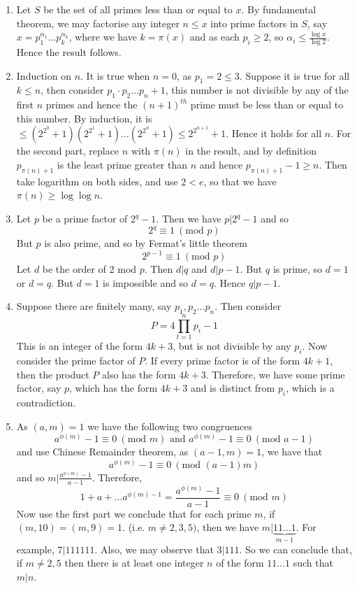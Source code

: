 \begin{enumerate}
\item Let $S$ be the set of all primes less than or equal to $x$. By fundamental theorem, we may factorise any integer $n \le x$ into prime factors in $S$, say $x=p_1^{\alpha_1} \ldots p_k^{\alpha_k}$, where we have $k=\pi(x)$ and as each $p_i \ge 2$, so $\alpha_i \le \frac{\log{x}}{\log{2}}$.
    Hence the result follows.
\item Induction on $n$. It is true when $n=0$, as $p_1=2 \le 3$. Suppose it is true for all $k \le n$, then consider $p_1 \cdot p_2 \ldots p_n +1$, this number is not divisible by any of the first $n$ primes and hence the $(n+1)^{th}$ prime must be less than or equal to this number. By induction, it is $\le (2^{2^0}+1)(2^{2^1}+1) \ldots (2^{2^n}+1) \le 2^{2^{n+1}}+1$. Hence it holds for all $n$. For the second part, replace $n$ with $\pi(n)$ in the result, and by definition $p_{\pi(n)+1}$ is the least prime greater than $n$ and hence $p_{\pi(n)+1}-1 \ge n$.
    Then take logarithm on both sides, and use $2 < e$, so that we have $\pi(n) \ge \log{\log{n}}$.
\item Let $p$ be a prime factor of $2^q-1$. Then we have $p|2^q -1$ and so
$$ 2^q \equiv 1~(\text{mod } p)$$ But $p$ is also prime, and so by Fermat's little theorem
$$ 2^{p-1} \equiv 1~(\text{mod } p)$$ Let $d$ be the order of $2$ mod $p$. Then $d|q$ and $d|p-1$. But $q$ is prime, so $d=1$ or $d=q$. But $d=1$ is impossible and so $d=q$. Hence $q|p-1$.
\item Suppose there are finitely many, say $p_1,p_2 \ldots p_n$. Then consider
$$ P=4\prod_{t=1}^{n}p_i -1$$ This is an integer of the form $4k+3$, but is not divisible by any $p_i$. Now consider the prime factor of $P$. If every prime factor is of the form $4k+1$, then the product $P$ also has the form $4k+3$. Therefore, we have some prime factor, say $p$, which has the form $4k+3$ and is distinct from $p_i$, which is a contradiction.
\item As $(a,m)=1$ we have the following two congruences
$$a^{\phi(m)}-1 \equiv 0~(\text{mod } m) \text{ and } a^{\phi(m)}-1 \equiv 0~(\text{mod } a-1)$$
and use Chinese Remainder theorem, as $(a-1,m)=1$, we have that
$$a^{\phi(m)}-1 \equiv 0~(\text{mod } (a-1)m)$$ and so $m|\frac{a^{\phi(m)}-1}{a-1}$. Therefore,
$$1+a+\ldots a^{\phi(m)-1}=\frac{a^{\phi(m)}-1}{a-1} \equiv 0~(\text{mod } m)$$
Now use the first part we conclude that for each prime $m$, if $(m,10)=(m,9)=1$. (i.e. $m \neq 2,3,5)$, then we have $m| \underbrace{11\ldots 1}_{m-1}$. For example, $7|111111$. Also, we may observe that $3|111$. So we can conclude that, if $m \neq 2,5$ then there is at least one integer $n$ of the form $11\ldots 1$ such that $m|n$. \\

\end{enumerate}
